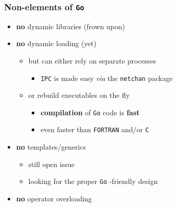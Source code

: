 \documentclass[bigger]{beamer}
\providecommand{\alert}[1]{\textbf{#1}}
\begin{document}
\begin{frame}
\frametitle{Non-elements of \verb~Go~}
\label{sec-1-19}


\begin{itemize}
\item \alert{no} dynamic libraries (frown upon)
\item \alert{no} dynamic loading (yet)
\begin{itemize}
\item but can either rely on separate processes
\begin{itemize}
\item \verb~IPC~ is made easy \emph{via} the \verb~netchan~ package
\end{itemize}
\item or rebuild executables on the fly
\begin{itemize}
\item \alert{compilation} of \verb~Go~ code is \alert{fast}
\item even faster than \verb~FORTRAN~ and/or \verb~C~
\end{itemize}
\end{itemize}
\item \alert{no} templates/generics
\begin{itemize}
\item still open issue
\item looking for the proper \verb~Go~ -friendly design
\end{itemize}
\item \alert{no} operator overloading
\end{itemize}
\end{frame}
\end{document}
